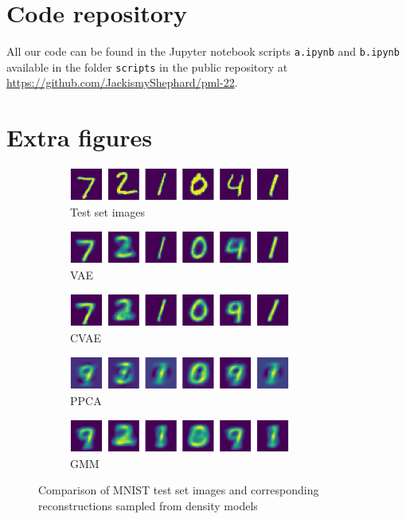 
\section{Code repository}
All our code can be found in the Jupyter notebook scripts \texttt{a.ipynb} and \texttt{b.ipynb} available in the folder \texttt{scripts} in the public repository at
\url{https://github.com/JackismyShephard/pml-22}.

\section{Extra figures}
\begin{figure}%
	\begin{subfigure}[t]{1\textwidth}
		\centering
		\includegraphics[width = 0.8\textwidth]{figures/ppca/real}
		\caption{Test set images}
	\end{subfigure}
	\begin{subfigure}[t]{1\textwidth}
		\centering
		\includegraphics[width = 0.8\textwidth]{figures/vae/mean}
		\caption{VAE}
	\end{subfigure}
	\begin{subfigure}[t]{1\textwidth}
		\centering
		\includegraphics[width = 0.8\textwidth]{figures/cvae/mean}
		\caption{CVAE}
	\end{subfigure}
	\begin{subfigure}[t]{1\textwidth}
		\centering
		\includegraphics[width = 0.8\textwidth]{figures/ppca/mean}
		\caption{PPCA}
	\end{subfigure}
	\begin{subfigure}[t]{1\textwidth}
		\centering
		\includegraphics[width = 0.8\textwidth]{figures/gmm/mean}
		\caption{GMM}
	\end{subfigure}
	\caption{Comparison of MNIST test set images and corresponding reconstructions sampled from density models}
\end{figure}

